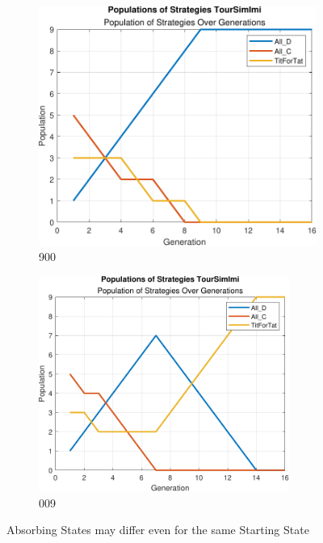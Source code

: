 \documentclass[12pt]{article}
\begin{document}
	\begin{figure}[H]
	\centering
	\begin{subfigure}{.5\textwidth}
		\centering
      		\includegraphics[width=.9\textwidth]{900.pdf}
		\caption{900}
	\end{subfigure}%
	\begin{subfigure}{.5\textwidth}
		\centering
      		\includegraphics[width=0.90\textwidth]{009.pdf}
		\caption{009}
	\end{subfigure}
	\caption{Absorbing States may differ even for the same Starting State}
	\end{figure}
\end{document}
